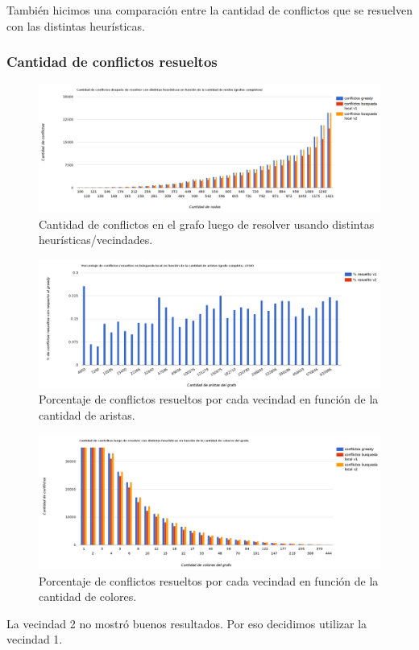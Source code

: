  También hicimos una comparación entre la cantidad de conflictos que se resuelven con las distintas heurísticas.
 



 
 
 
 \subsubsection{Cantidad de conflictos resueltos}
 
   \begin{figure}[H]
	\centering
 	\includegraphics[width=18cm]{imagenes/Ej4/conflictosVsNodos.png}
	\caption{Cantidad de conflictos en el grafo luego de resolver usando distintas heurísticas/vecindades.}
	\label{conflictosEj4}
 \end{figure}
 
 \begin{figure}[H]
	\centering
 	\includegraphics[width=18cm]{imagenes/Ej4/porcentajeConflictosVsAristas.png}
	\caption{Porcentaje de conflictos resueltos por cada vecindad en función de la cantidad de aristas.}
	\label{conflictosEj4-porcentaje}
 \end{figure}
 
 
  \begin{figure}[H]
	\centering
 	\includegraphics[width=18cm]{imagenes/Ej4/conflictosVsColores.png}
	\caption{Porcentaje de conflictos resueltos por cada vecindad en función de la cantidad de colores.}
	\label{conflictosEj4-porcentaje}
 \end{figure}
 
 
 La vecindad 2 no mostró buenos resultados. Por eso decidimos utilizar la vecindad 1.